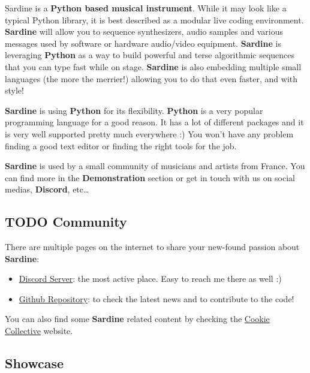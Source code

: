 \documentclass[11pt]{article}
\begin{document}
Sardine is a \textbf{Python based musical instrument}. While it may look like a typical Python library, it is best described as a modular live coding environment. \textbf{Sardine} will allow you to sequence synthesizers, audio samples and various messages used by software or hardware audio/video equipment. \textbf{Sardine} is leveraging \textbf{Python} as a way to build powerful and terse algorithmic sequences that you can type fast while on stage. \textbf{Sardine} is also embedding multiple small languages (the more the merrier!) allowing you to do that even faster, and with style!

\textbf{Sardine} is using \textbf{Python} for its flexibility. \textbf{Python} is a very popular programming language for a good reason. It has a lot of different packages and it is very well supported pretty much everywhere :) You won't have any problem finding a good text editor or finding the right tools for the job.

\textbf{Sardine} is used by a small community of musicians and artists from France. You can find more in the \textbf{Demonstration} section or get in touch with us on social medias, \textbf{Discord}, etc\ldots{}

\begin{center}

\end{center}

\subsection{{\bfseries\sffamily TODO} Community}
\label{sec:orgd38cab9}

There are multiple pages on the internet to share your new-found passion about \textbf{Sardine}:
\begin{itemize}
\item \href{https://discord.gg/aPgV7mSFZh}{Discord Server}: the most active place. Easy to reach me there as well :)
\item \href{https://github.com/Bubobubobubobubo/sardine}{Github Repository}: to check the latest news and to contribute to the code!
\end{itemize}

You can also find some \textbf{Sardine} related content by checking the \href{https://cookie.paris}{Cookie Collective} website.

\subsection{Showcase}
\label{sec:orgc36e27c}
\end{document}
